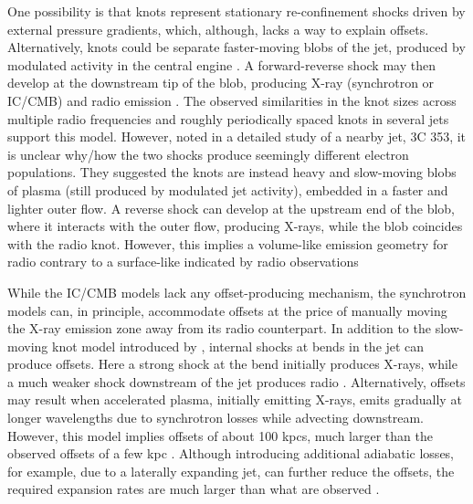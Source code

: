 One possibility is that knots represent stationary re-confinement shocks driven by external pressure gradients\citep[e.g.,][]{komissarov1998large}, which, although, lacks a way to explain offsets. Alternatively, knots could be separate faster-moving blobs of the jet, produced by modulated activity in the central engine  \citep[e.g.,][]{bridle1986collimation,bridle1989unusual,clarke1992origin,stawarz2004multiwavelength}. A forward-reverse shock may then develop at the downstream tip of the blob, producing X-ray (synchrotron or IC/CMB) and radio emission \citep{stawarz2004multiwavelength}. The observed similarities in the knot sizes across multiple radio frequencies and roughly periodically spaced knots in several jets support this model. However, \citep{kataoka2008chandra} noted in a detailed study of a nearby jet, 3C 353, it is unclear why/how the two shocks produce seemingly different electron populations. They suggested the knots are instead heavy and slow-moving blobs of plasma (still produced by modulated jet activity), embedded in a faster and lighter outer flow. A reverse shock can develop at the upstream end of the blob, where it interacts with the outer flow, producing X-rays, while the blob coincides with the radio knot. However, this implies a volume-like emission geometry for radio contrary to a surface-like indicated by radio observations \cite[e.g.,][]{swain1998internal}  

While the IC/CMB models lack any offset-producing mechanism, the synchrotron models can, in principle, accommodate offsets at the price of manually moving the X-ray emission zone away from its radio counterpart. In addition to the slow-moving knot model introduced by \citet{kataoka2008chandra}, internal shocks at bends in the jet can produce offsets. Here a strong shock at the bend initially produces X-rays, while a much weaker shock downstream of the jet produces radio \citep{2005MNRAS.360..926W}. Alternatively, offsets may result when accelerated plasma, initially emitting X-rays, emits gradually at longer wavelengths due to synchrotron losses while advecting downstream. However, this model implies offsets of about 100 kpcs, much larger than the observed offsets of a few kpc \citep[e.g.,][]{siemiginowska2007300,Clautice:2016zai}. Although introducing additional adiabatic losses, for example, due to a laterally expanding jet, can further reduce the offsets, the required expansion rates are much larger than what are observed \citep[e.g.,][]{swain1998internal,kataoka2008chandra}.

